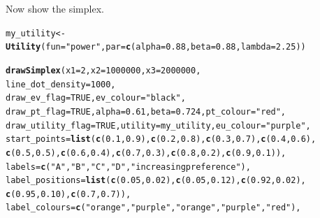 \documentclass{article}\usepackage[]{graphicx}\usepackage[]{color}
\makeatletter
\newcommand{\hlnum}[1]{\textcolor[rgb]{0.686,0.059,0.569}{#1}}%
\newcommand{\hlstr}[1]{\textcolor[rgb]{0.192,0.494,0.8}{#1}}%
\newcommand{\hlstd}[1]{\textcolor[rgb]{0.345,0.345,0.345}{#1}}%
\newcommand{\hlkwb}[1]{\textcolor[rgb]{0.69,0.353,0.396}{#1}}%
\newcommand{\hlkwc}[1]{\textcolor[rgb]{0.333,0.667,0.333}{#1}}%
\newcommand{\hlkwd}[1]{\textcolor[rgb]{0.737,0.353,0.396}{\textbf{#1}}}%
\newenvironment{kframe}{%
 \def\at@end@of@kframe{}%
 \ifinner\ifhmode%
  \def\at@end@of@kframe{\end{minipage}}%
  \begin{minipage}{\columnwidth}%
 \fi\fi%
 \def\FrameCommand##1{\hskip\@totalleftmargin \hskip-\fboxsep
 \colorbox{shadecolor}{##1}\hskip-\fboxsep
     \hskip-\linewidth \hskip-\@totalleftmargin \hskip\columnwidth}%
 \MakeFramed {\advance\hsize-\width
   \@totalleftmargin\z@ \linewidth\hsize
   \@setminipage}}%
 {\par\unskip\endMakeFramed%
 \at@end@of@kframe}
\newenvironment{knitrout}{}{} %
\makeatother
\begin{document}
Now show the simplex.

\begin{knitrout}
\color{fgcolor}\begin{kframe}
\begin{alltt}
\hlstd{my_utility} \hlkwb{<-} \hlkwd{Utility}\hlstd{(}\hlkwc{fun}\hlstd{=}\hlstr{"power"}\hlstd{,} \hlkwc{par}\hlstd{=}\hlkwd{c}\hlstd{(}\hlkwc{alpha}\hlstd{=}\hlnum{0.88}\hlstd{,} \hlkwc{beta}\hlstd{=}\hlnum{0.88}\hlstd{,} \hlkwc{lambda}\hlstd{=}\hlnum{2.25}\hlstd{))}

\hlkwd{drawSimplex}\hlstd{(}\hlkwc{x1}\hlstd{=}\hlnum{2}\hlstd{,} \hlkwc{x2}\hlstd{=}\hlnum{1000000}\hlstd{,} \hlkwc{x3}\hlstd{=}\hlnum{2000000}\hlstd{,}
        \hlkwc{line_dot_density}\hlstd{=}\hlnum{1000}\hlstd{,}
        \hlkwc{draw_ev_flag}\hlstd{=}\hlnum{TRUE}\hlstd{,} \hlkwc{ev_colour}\hlstd{=}\hlstr{"black"}\hlstd{,}
        \hlkwc{draw_pt_flag}\hlstd{=}\hlnum{TRUE}\hlstd{,} \hlkwc{alpha}\hlstd{=}\hlnum{0.61}\hlstd{,} \hlkwc{beta}\hlstd{=}\hlnum{0.724}\hlstd{,} \hlkwc{pt_colour}\hlstd{=}\hlstr{"red"}\hlstd{,}
        \hlkwc{draw_utility_flag}\hlstd{=}\hlnum{TRUE}\hlstd{,} \hlkwc{utility}\hlstd{=my_utility,} \hlkwc{eu_colour}\hlstd{=}\hlstr{"purple"}\hlstd{,}
        \hlkwc{start_points}\hlstd{=}\hlkwd{list}\hlstd{(}\hlkwd{c}\hlstd{(}\hlnum{0.1}\hlstd{,}\hlnum{0.9}\hlstd{),}\hlkwd{c}\hlstd{(}\hlnum{0.2}\hlstd{,}\hlnum{0.8}\hlstd{),}\hlkwd{c}\hlstd{(}\hlnum{0.3}\hlstd{,}\hlnum{0.7}\hlstd{),}\hlkwd{c}\hlstd{(}\hlnum{0.4}\hlstd{,}\hlnum{0.6}\hlstd{),}
                \hlkwd{c}\hlstd{(}\hlnum{0.5}\hlstd{,}\hlnum{0.5}\hlstd{),}\hlkwd{c}\hlstd{(}\hlnum{0.6}\hlstd{,}\hlnum{0.4}\hlstd{),}\hlkwd{c}\hlstd{(}\hlnum{0.7}\hlstd{,}\hlnum{0.3}\hlstd{),}\hlkwd{c}\hlstd{(}\hlnum{0.8}\hlstd{,}\hlnum{0.2}\hlstd{),}\hlkwd{c}\hlstd{(}\hlnum{0.9}\hlstd{,}\hlnum{0.1}\hlstd{)),}
        \hlkwc{labels}\hlstd{=}\hlkwd{c}\hlstd{(}\hlstr{"A"}\hlstd{,}\hlstr{"B"}\hlstd{,}\hlstr{"C"}\hlstd{,}\hlstr{"D"}\hlstd{,}\hlstr{"increasing preference"}\hlstd{),}
        \hlkwc{label_positions}\hlstd{=}\hlkwd{list}\hlstd{(}\hlkwd{c}\hlstd{(}\hlnum{0.05}\hlstd{,}\hlnum{0.02}\hlstd{),}\hlkwd{c}\hlstd{(}\hlnum{0.05}\hlstd{,}\hlnum{0.12}\hlstd{),}\hlkwd{c}\hlstd{(}\hlnum{0.92}\hlstd{,}\hlnum{0.02}\hlstd{),}
                \hlkwd{c}\hlstd{(}\hlnum{0.95}\hlstd{,}\hlnum{0.10}\hlstd{),}\hlkwd{c}\hlstd{(}\hlnum{0.7}\hlstd{,}\hlnum{0.7}\hlstd{)),}
        \hlkwc{label_colours}\hlstd{=}\hlkwd{c}\hlstd{(}\hlstr{"orange"}\hlstd{,}\hlstr{"purple"}\hlstd{,}\hlstr{"orange"}\hlstd{,}\hlstr{"purple"}\hlstd{,}\hlstr{"red"}\hlstd{),}

\end{alltt}
\end{kframe}
\end{knitrout}
\end{document}

